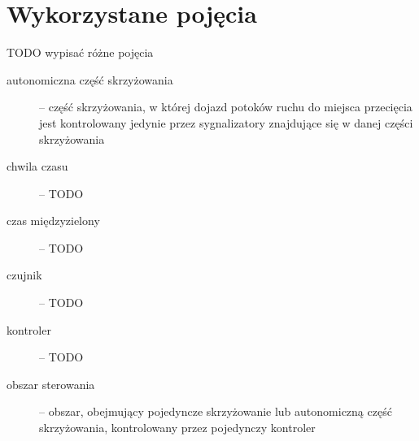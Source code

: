 \chapter{Wykorzystane pojęcia}

TODO wypisać różne pojęcia

\begin{description}

\item[autonomiczna część skrzyżowania] --
część skrzyżowania, w której dojazd potoków ruchu do miejsca przecięcia jest kontrolowany
jedynie przez sygnalizatory znajdujące się w danej części skrzyżowania

\item[chwila czasu] -- TODO

\item[czas międzyzielony] -- TODO

\item[czujnik] -- TODO

\item[kontroler] -- TODO

\item[obszar sterowania] --
obszar, obejmujący pojedyncze skrzyżowanie lub autonomiczną część skrzyżowania,
kontrolowany przez pojedynczy kontroler

\end{description}